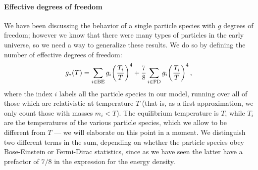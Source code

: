 \documentclass[main.tex]{subfiles}
\begin{document}
\paragraph{Effective degrees of freedom}







We have been discussing the behavior of a single particle species with \(g\) degrees of freedom; however we know that there were many types of particles in the early universe, so we need a way to generalize these results.
We do so by defining the number of effective degrees of freedom: 
%
\begin{align}
g_*(T) = 
\sum _{i \in \text{BE}} g_i \qty(\frac{T_i}{T})^{4}
+
\frac{7}{8}
\sum _{i \in \text{FD}} g_i \qty(\frac{T_i}{T})^{4}
\,,
\end{align}
%
where the index \(i\) labels all the particle species in our model, running over all of those which are relativistic at temperature \(T\) (that is, as a first approximation, we only count those with masses \(m_i < T\)). 
The equilibrium temperature is \(T\), while \(T_i\) are the temperatures of the various particle species, which we allow to be different from \(T\) --- we will elaborate on this point in a moment.
We distinguish two different terms in the sum, depending on whether the particle species obey Bose-Einstein or Fermi-Dirac statistics, since as we have seen the latter have a prefactor of \(7/8\) in the expression for the energy density. 
\end{document}
